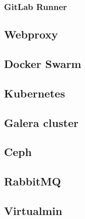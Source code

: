 			\subsubsection{GitLab Runner}
		\subsection{Webproxy}
		\subsection{Docker Swarm}
		\subsection{Kubernetes}
		\subsection{Galera cluster}
		\subsection{Ceph}
		\subsection{RabbitMQ}
		\subsection{Virtualmin}
		